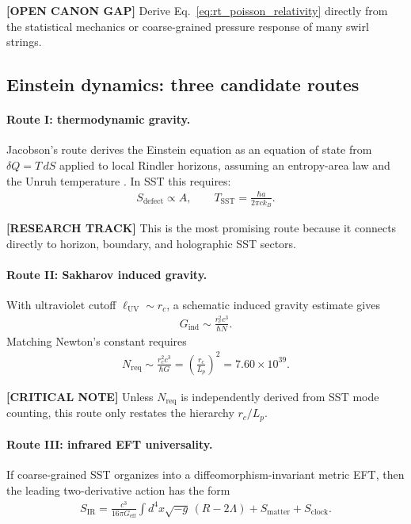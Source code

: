 \textbf{[OPEN CANON GAP]} Derive Eq.~\eqref{eq:rt_poisson_relativity} directly from the
statistical mechanics or coarse-grained pressure response of many swirl strings.

\subsection{Einstein dynamics: three candidate routes}

\paragraph{Route I: thermodynamic gravity.}
Jacobson's route derives the Einstein equation as an equation of state from
\(\delta Q=T\,dS\) applied to local Rindler horizons, assuming an entropy-area
law and the Unruh temperature \cite{Jacobson1995}. In SST this requires:
\begin{align}
    S_{\mathrm{defect}}
    \propto
    A,
    \qquad
    T_{\mathrm{SST}}
    =
    \frac{\hbar a}{2\pi c k_B}.
\end{align}

\textbf{[RESEARCH TRACK]} This is the most promising route because it connects
directly to horizon, boundary, and holographic SST sectors.

\paragraph{Route II: Sakharov induced gravity.}
With ultraviolet cutoff \(\ell_{\mathrm{UV}}\sim r_c\), a schematic induced
gravity estimate gives \cite{Sakharov1967}
\begin{align}
    G_{\mathrm{ind}}
    \sim
    \frac{r_c^2 c^3}{\hbar N}.
\end{align}
Matching Newton's constant requires
\begin{align}
    N_{\mathrm{req}}
    \sim
    \frac{r_c^2 c^3}{\hbar G}
    =
    \left(\frac{r_c}{L_p}\right)^2
    =
    7.60\times10^{39}.
\end{align}

\textbf{[CRITICAL NOTE]} Unless \(N_{\mathrm{req}}\) is independently derived
from SST mode counting, this route only restates the hierarchy
\(r_c/L_p\).

\paragraph{Route III: infrared EFT universality.}
If coarse-grained SST organizes into a diffeomorphism-invariant metric EFT,
then the leading two-derivative action has the form
\begin{align}
    S_{\mathrm{IR}}
    =
    \frac{c^3}{16\pi G_{\mathrm{eff}}}
    \int d^4x \sqrt{-g}\,
    \left(R-2\Lambda\right)
    + S_{\mathrm{matter}}
    + S_{\mathrm{clock}} .
\end{align}

